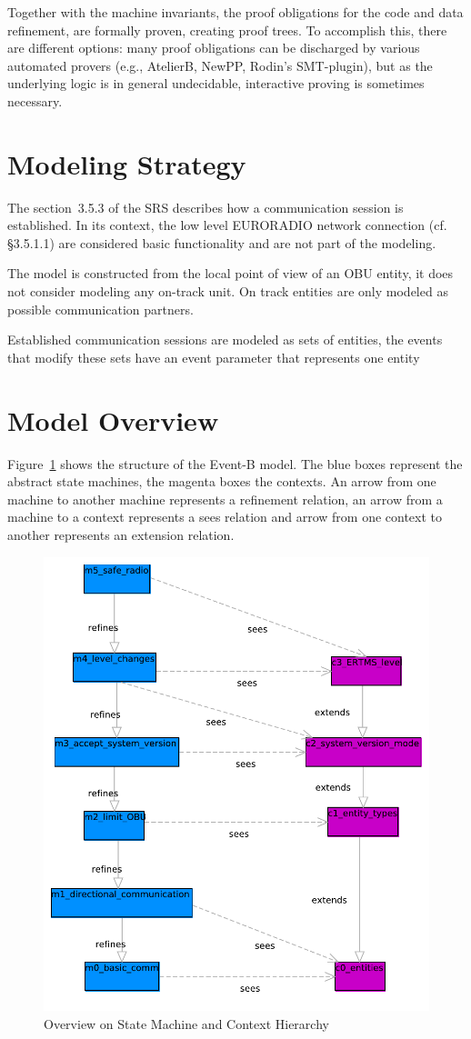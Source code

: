 \documentclass[10pt,a4paper]{article}
\begin{document}
Together with the machine invariants, the proof obligations for the code and
data refinement, are formally proven, creating proof trees. To accomplish this,
there are different options: many proof obligations can be discharged by various
automated provers (e.g., AtelierB, NewPP, Rodin's SMT-plugin), but as the
underlying logic is in general undecidable, interactive proving is sometimes
necessary.

\section{Modeling Strategy}
\label{sec:modeling-strategy}

The section~3.5.3 of the SRS describes how a communication session is
established. In its context, the low level EURORADIO network connection
(cf. §3.5.1.1) are considered basic functionality and are not part of the
modeling.

The model is constructed from the local point of view of an OBU entity, it does
not consider modeling any on-track unit. On track entities are only modeled as
possible communication partners.

Established communication sessions are modeled as sets of entities, the events
that modify these sets have an event parameter that represents one entity

\section{Model Overview}
\label{sec:model-overview}

Figure~\ref{fig:model-overview} shows the structure of the Event-B model. The
blue boxes represent the abstract state machines, the magenta boxes the
contexts. An arrow from one machine to another machine represents a refinement
relation, an arrow from a machine to a context represents a sees relation and
arrow from one context to another represents an extension relation.

\begin{figure}[ht]
  \centering
  \includegraphics[width=.5\textwidth]{Subset_026_comm_session}
  \caption{Overview on State Machine and Context Hierarchy}
  \label{fig:model-overview}
\end{figure}
\end{document}
